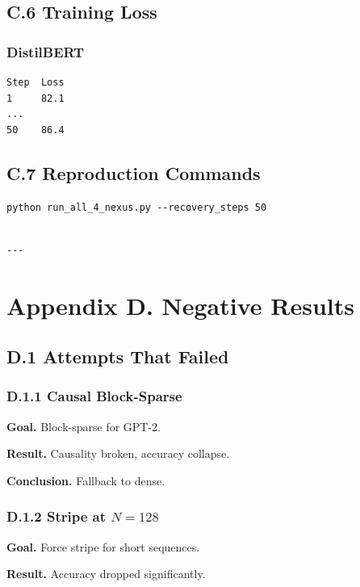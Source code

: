\subsection{C.6 Training Loss}

\subsubsection{DistilBERT}
\begin{lstlisting}
Step  Loss
1     82.1
...
50    86.4
\end{lstlisting}

\subsection{C.7 Reproduction Commands}

\begin{lstlisting}
python run_all_4_nexus.py --recovery_steps 50
\end{lstlisting}
\begin{lstlisting}

---
\end{lstlisting}

\section{Appendix D. Negative Results}

\subsection{D.1 Attempts That Failed}

\subsubsection{D.1.1 Causal Block-Sparse}

\textbf{Goal.} Block-sparse for GPT-2.

\textbf{Result.} Causality broken, accuracy collapse.

\textbf{Conclusion.} Fallback to dense.

\subsubsection{D.1.2 Stripe at $N=128$}

\textbf{Goal.} Force stripe for short sequences.

\textbf{Result.} Accuracy dropped significantly.

